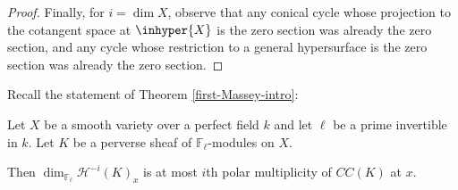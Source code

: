 \begin{proof}

 Finally, for $i = \dim X$, observe that any conical cycle whose projection to the cotangent space at $\inhyper{X}$ is the zero section was already the zero section, and any cycle whose restriction to a general hypersurface is the zero section was already the zero section.

\end{proof}



Recall the statement of Theorem \ref{first-Massey-intro}:

\begin{theorem}
\notready\label{first-Massey}Let $X$ be a smooth variety over a perfect field $k$ and let $\ell$ be a prime invertible in $k$. Let $K$ be a perverse sheaf of $\mathbb F_\ell$-modules on $X$.

Then $\dim_{\mathbb F_\ell} \mathcal H^{-i}(K)_x$ is at most $i$th polar multiplicity of $CC(K)$ at $x$.  \end{theorem}



